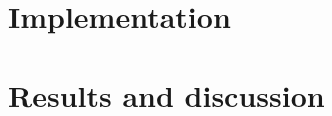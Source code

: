 \documentclass{bioinfo}
\begin{document}
\section{Implementation}
\section{Results and discussion}

%
%
%
%
%
%

%

\end{document}
